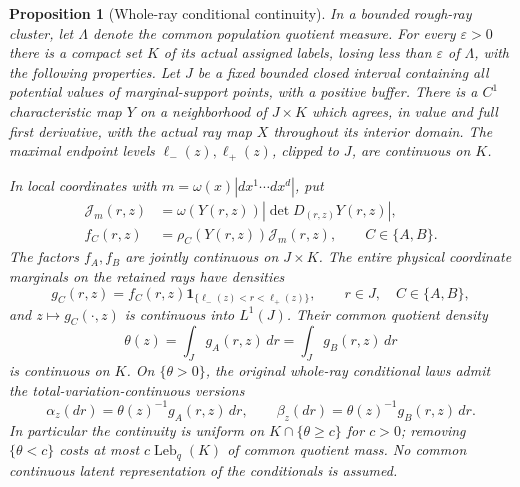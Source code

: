 \documentclass[11pt,reqno]{amsart}
\newtheorem{proposition}[theorem]{Proposition}
\theoremstyle{definition}
\theoremstyle{remark}
\numberwithin{equation}{section}
\begin{document}
\begin{proposition}[Whole-ray conditional continuity]
\label{prop:compact-conditional-whole}
In a bounded rough-ray cluster, let \(\Lambda\) denote the common
population quotient measure. For every \(\varepsilon>0\) there is
a compact set \(K\) of its actual assigned labels, losing less than
\(\varepsilon\) of \(\Lambda\), with the following properties.
Let \(J\) be a fixed bounded closed interval containing all potential
values of marginal-support points, with a positive buffer. There is
a \(C^1\) characteristic map \(Y\) on a neighborhood of \(J\times K\)
which agrees, in value and full first derivative, with the actual ray
map \(X\) throughout its interior domain. The maximal endpoint levels
\(\ell_-(z),\ell_+(z)\), clipped to \(J\), are continuous on \(K\).

In local coordinates with \(m=\omega(x)|dx^1\cdots dx^d|\), put
\begin{equation}
\label{eq:compact-conditional-jacobian}
\begin{aligned}
 \mathcal J_m(r,z)
   &=\omega(Y(r,z))\left|\det D_{(r,z)}Y(r,z)\right|,\\
 f_C(r,z)&=\rho_C(Y(r,z))\mathcal J_m(r,z),
 \qquad C\in\{A,B\}.
\end{aligned}
\end{equation}
The factors \(f_A,f_B\) are jointly continuous on \(J\times K\).
The entire physical coordinate marginals on the retained rays have
densities
\begin{equation}
\label{eq:compact-conditional-whole-densities}
 g_C(r,z)=f_C(r,z)
       \mathbf 1_{\{\ell_-(z)<r<\ell_+(z)\}},
 \qquad r\in J,\quad C\in\{A,B\},
\end{equation}
and \(z\mapsto g_C(\cdot,z)\) is continuous into \(L^1(J)\).
Their common quotient density
\begin{equation}
\label{eq:compact-conditional-normalization}
 \theta(z)=\int_Jg_A(r,z)\,dr=\int_Jg_B(r,z)\,dr
\end{equation}
is continuous on \(K\). On \(\{\theta>0\}\), the original
whole-ray conditional laws admit the total-variation-continuous versions
\[
 \alpha_z(dr)=\theta(z)^{-1}g_A(r,z)\,dr,
 \qquad
 \beta_z(dr)=\theta(z)^{-1}g_B(r,z)\,dr.
\]
In particular the continuity is uniform on \(K\cap\{\theta\ge c\}\)
for \(c>0\); removing \(\{\theta<c\}\) costs at most
\(c\operatorname{Leb}_q(K)\) of common quotient mass.
No common continuous latent representation of the conditionals is assumed.
\end{proposition}
\end{document}
